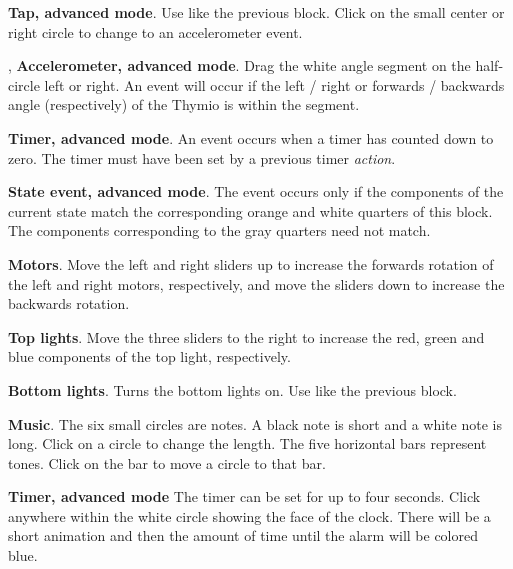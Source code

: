 \bigskip\bigskip\bigskip

 \textbf{Tap, advanced mode}. Use like the
previous block. Click on the small center or right circle to change to
an accelerometer event.

\bigskip\bigskip

,  \textbf{Accelerometer,
advanced mode}. Drag the white angle segment on the half-circle left or right.
An event will occur if the left / right or forwards / backwards angle
(respectively) of the Thymio is within the segment.

\bigskip\bigskip\bigskip\bigskip

 \textbf{Timer, advanced mode}. An event occurs when
a timer has counted down to zero. The timer must have been set by a
previous timer \emph{action}.

\bigskip\bigskip\bigskip

 \textbf{State event, advanced mode}. The event
occurs only if the components of the current state match the
corresponding orange and white quarters of this block. The components
corresponding to the gray quarters need not match.

\bigskip


 \textbf{Motors}. Move the left and right sliders
up to increase the forwards rotation of the left and right motors,
respectively, and move the sliders down to increase the backwards
rotation.

\bigskip\bigskip

 \textbf{Top lights}. Move the three sliders to
the right to increase the red, green and blue components of the top
light, respectively.

\bigskip\bigskip

 \textbf{Bottom lights}. Turns the bottom
lights on. Use like the previous block.

\bigskip\bigskip\bigskip\bigskip

 \textbf{Music}. The six small circles are notes. A
black note is short and a white note is long. Click on a circle to
change the length. The five horizontal bars represent tones. Click on
the bar to move a circle to that bar.

\bigskip\bigskip

 \textbf{Timer, advanced mode} The timer can be set
for up to four seconds. Click anywhere within the white circle showing
the face of the clock. There will be a short animation and then the
amount of time until the alarm will be colored blue.

